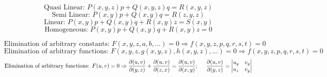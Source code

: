 \documentclass{article}
\begin{document}
\begin{tcbraster}[raster equal height,raster valign=top,raster columns=2, raster rows=1]
\begin{tcolorbox}[colframe=SkyBlue, colback=SkyBlue!15, height=9cm, width = 25cm,title=\begin{center} \begin{Large} \textbf{Solutions of PDEs} \end{Large} \end{center}]
	\end{tcolorbox}
	\begin{tcolorbox}[boxsep=0pt,boxrule=0pt,colback=white,colframe=white]
		\begin{tcolorbox}[colframe=SkyBlue, colback=SkyBlue!15, height=4.25cm, width = 26.5cm, title=\begin{center} \begin{Large} \textbf{First Order PDE} \end{Large} \end{center}]
			$$\text{Quasi Linear: } P(x,y,z)p + Q(x,y,z)q = R(x,y,z)$$
			$$\text{Semi Linear: } P(x,y)p + Q(x,y)q = R(z,y,z)$$
			$$\text{Linear: } P(x,y)p + Q(x,y)q + R(x,y)z = S(x,y)$$
			$$\text{Homogeneous: } P(x,y)p + Q(x,y)q + R(x,y)z = 0$$
		\end{tcolorbox}
		\begin{tcolorbox}[colframe=SkyBlue, colback=SkyBlue!15, height=4.25cm, width = 26.5cm, title=\begin{center} \begin{Large} \textbf{Formation of a PDE} \end{Large} \end{center}]
			$$\text{Elimination of arbitrary constants: } F(x,y,z,a,b, \dots) = 0 \Rightarrow f(x,y,z,p,q,r,s,t)=0$$
			$$\text{Elimination of arbitrary functions: } F(x,y,z,g(x,y,z),h(x,y,z), \dots) = 0 \Rightarrow f(x,y,z,p,q,r,s,t)=0$$
			$$\text{Elimination of arbitrary functions: } F(u,v) = 0 \Rightarrow 
			\frac{\partial(u,v)}{\partial(y,z)} + \frac{\partial(u,v)}{\partial(z,x)} = \frac{\partial(u,v)}{\partial(x,y)}; \hspace{0.5cm}
			\frac{\partial(u,v)}{\partial(y,z)} = \mdet{u_y & v_y \\ u_z & v_y}$$
		\end{tcolorbox}
	\end{tcolorbox}
\end{tcbraster}

\end{document}

